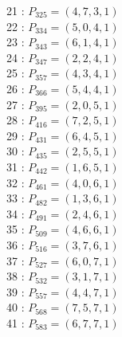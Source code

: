 \documentclass{article}
\begin{document}
{\begin{multicols}{2}
21 : $P_{325}=( 4, 7, 3, 1 )$\\
22 : $P_{334}=( 5, 0, 4, 1 )$\\
23 : $P_{343}=( 6, 1, 4, 1 )$\\
24 : $P_{347}=( 2, 2, 4, 1 )$\\
25 : $P_{357}=( 4, 3, 4, 1 )$\\
26 : $P_{366}=( 5, 4, 4, 1 )$\\
27 : $P_{395}=( 2, 0, 5, 1 )$\\
28 : $P_{416}=( 7, 2, 5, 1 )$\\
29 : $P_{431}=( 6, 4, 5, 1 )$\\
30 : $P_{435}=( 2, 5, 5, 1 )$\\
31 : $P_{442}=( 1, 6, 5, 1 )$\\
32 : $P_{461}=( 4, 0, 6, 1 )$\\
33 : $P_{482}=( 1, 3, 6, 1 )$\\
34 : $P_{491}=( 2, 4, 6, 1 )$\\
35 : $P_{509}=( 4, 6, 6, 1 )$\\
36 : $P_{516}=( 3, 7, 6, 1 )$\\
37 : $P_{527}=( 6, 0, 7, 1 )$\\
38 : $P_{532}=( 3, 1, 7, 1 )$\\
39 : $P_{557}=( 4, 4, 7, 1 )$\\
40 : $P_{568}=( 7, 5, 7, 1 )$\\
41 : $P_{583}=( 6, 7, 7, 1 )$\\
\end{multicols}
}
\end{document}

